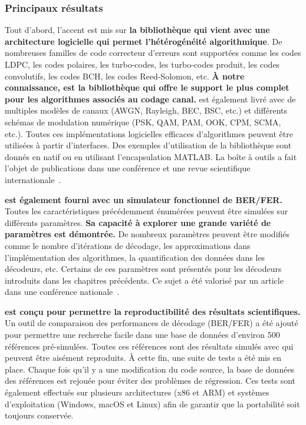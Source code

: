 \subsubsection*{Principaux résultats}

Tout d'abord, l'accent est mis sur \textbf{la bibliothèque \AFFECT qui vient
avec une architecture logicielle qui permet l'hétérogénéité algorithmique}. De
nombreuses familles de code correcteur d'erreurs sont supportées comme les
codes LDPC, les codes polaires, les turbo-codes, les turbo-codes produit, les
codes convolutifs, les codes BCH, les codes Reed-Solomon, etc. \textbf{À notre
connaissance, \AFFECT est la bibliothèque qui offre le support le plus complet
pour les algorithmes associés au codage canal.} \AFFECT est également livré avec
de multiples modèles de canaux  (AWGN, Rayleigh, BEC, BSC, etc.) et différents
schémas de modulation numérique (PSK, QAM, PAM, OOK, CPM, SCMA, etc.). Toutes
ces implémentations logicielles efficaces d'algorithmes peuvent être utilisées à
partir d'interfaces. Des exemples d'utilisation de la bibliothèque sont donnés
en \Cxx natif ou en utilisant l'encapsulation MATLAB\R. La boîte à outils
\AFFECT a fait l'objet de publications dans une conférence et une revue
scientifique internationale~\cite{Cassagne2017a,Cassagne2019a}.

\textbf{\AFFECT est également fourni avec un simulateur fonctionnel de BER/FER.}
Toutes les caractéristiques précédemment énumérées peuvent être simulées sur
différents paramètres. \textbf{Sa capacité à explorer une grande variété de
paramètres est démontrée.} De nombreux paramètres peuvent être modifiés comme le
nombre d'itérations de décodage, les approximations dans l'implémentation des
algorithmes, la quantification des données dans les décodeurs, etc. Certains de
ces paramètres sont présentés pour les décodeurs introduits dans les chapitres
précédents. Ce sujet a été valorisé par un article dans une conférence
nationale~\cite{Cassagne2017}.

\textbf{\AFFECT est conçu pour permettre la reproductibilité des résultats
scientifiques.} Un outil de comparaison des performances de décodage (BER/FER) a
été ajouté pour permettre une recherche facile dans une base de données
d'environ 500 références pré-simulées. Toutes ces références sont des résultats
simulés avec \AFFECT qui peuvent être aisément reproduits. À cette fin, une
suite de tests a été mis en place. Chaque fois qu'il y a une modification du
code source, la base de données des références est rejouée pour éviter des
problèmes de régression. Ces tests sont également effectués sur plusieurs
architectures (x86 et ARM\R) et systèmes d'exploitation (Windows, macOS et
Linux) afin de garantir que la portabilité soit toujours conservée.

